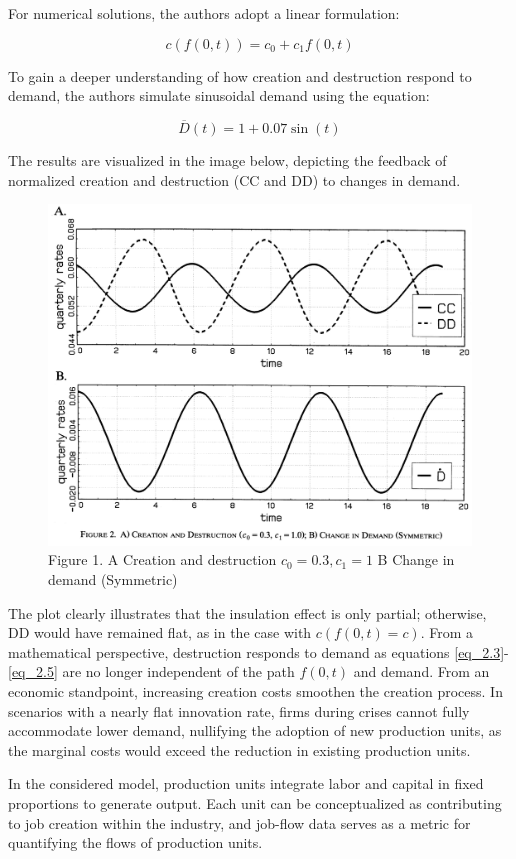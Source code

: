 \documentclass[12pt]{report}
\begin{document}
For numerical solutions, the authors adopt a linear formulation:

\[c(f(0,t))=c_0+c_1f(0,t)\]

To gain a deeper understanding of how creation and destruction respond to demand, the authors simulate sinusoidal demand
using the equation: 

\[\overline{D}(t)=1+0.07\sin(t)\]

The results are visualized in the image below, depicting the feedback of normalized creation and destruction (CC and DD)
to changes in demand. 

\begin{figure}
    \centering
    \includegraphics[scale = 0.4]{figure/Plot2.1.png}
    \caption{Figure 1. A Creation and destruction \(c_0=0.3, c_1=1\) B Change in demand (Symmetric)}
    \label{plot:2.1}
\end{figure}

The plot clearly illustrates that the insulation effect is only partial; otherwise, DD would have remained flat, as in
the case with \(c(f(0,t)=c)\). From a mathematical perspective, destruction responds to demand as equations
\ref{eq_2.3}-\ref{eq_2.5} are no longer independent of the path \(f(0,t)\) and demand. From an economic standpoint,
increasing creation costs smoothen the creation process. In scenarios with a nearly flat innovation rate, firms during
crises cannot fully accommodate lower demand, nullifying the adoption of new production units, as the marginal costs
would exceed the reduction in existing production units. \par
In the considered model, production units integrate labor and capital in fixed proportions to generate output. Each unit
can be conceptualized as contributing to job creation within the industry, and job-flow data serves as a metric for
quantifying the flows of production units. 
\end{document}
